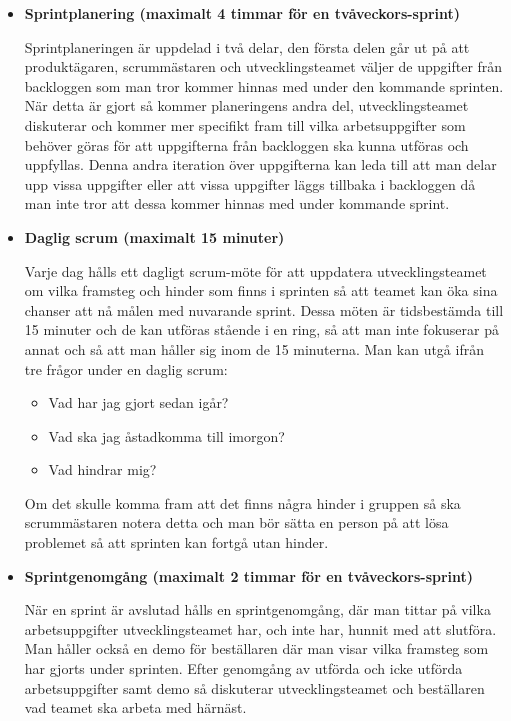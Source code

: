 \begin{itemize}
	\item \textbf{Sprintplanering (maximalt 4 timmar för en tvåveckors-sprint)}
	
	Sprintplaneringen är uppdelad i två delar, den första delen går ut på att produktägaren, scrummästaren och utvecklingsteamet väljer de uppgifter från backloggen som man tror kommer hinnas med under den kommande sprinten. När detta är gjort så kommer planeringens andra del, utvecklingsteamet diskuterar och kommer mer specifikt fram till vilka arbetsuppgifter som behöver göras för att uppgifterna från backloggen ska kunna utföras och uppfyllas. Denna andra iteration över uppgifterna kan leda till att man delar upp vissa uppgifter eller att vissa uppgifter läggs tillbaka i backloggen då man inte tror att dessa kommer hinnas med under kommande sprint.
	
	\item \textbf{Daglig scrum (maximalt 15 minuter)}
	
	Varje dag hålls ett dagligt scrum-möte för att uppdatera utvecklingsteamet om vilka framsteg och hinder som finns i sprinten så att teamet kan öka sina chanser att nå målen med nuvarande sprint. Dessa möten är tidsbestämda till 15 minuter och de kan utföras stående i en ring, så att man inte fokuserar på annat och så att man håller sig inom de 15 minuterna. Man kan utgå ifrån tre frågor under en daglig scrum:
	
	\begin{itemize}
		\item Vad har jag gjort sedan igår?
		\item Vad ska jag åstadkomma till imorgon?
		\item Vad hindrar mig?
	\end{itemize}
	
	Om det skulle komma fram att det finns några hinder i gruppen så ska scrummästaren notera detta och man bör sätta en person på att lösa problemet så att sprinten kan fortgå utan hinder.
	
	\item \textbf{Sprintgenomgång (maximalt 2 timmar för en tvåveckors-sprint)}
	
	När en sprint är avslutad hålls en sprintgenomgång, där man tittar på vilka arbetsuppgifter utvecklingsteamet har, och inte har, hunnit med att slutföra. Man håller också en demo för beställaren där man visar vilka framsteg som har gjorts under sprinten. Efter genomgång av utförda och icke utförda arbetsuppgifter samt demo så diskuterar utvecklingsteamet och beställaren vad teamet ska arbeta med härnäst.
	 

\end{itemize}
